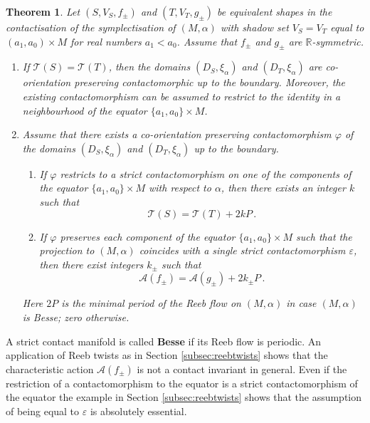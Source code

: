 \documentclass{amsart}
\newtheorem{thmintr}{Theorem}
\theoremstyle{definition}
\newcommand{\AAA}{\mathcal A}
\newcommand{\R}{\mathbb R}
\newcommand{\TT}{\mathcal T}
\begin{document}
\begin{thmintr}
\label{thmintr:contactbodiessympl}
Let $(S,V_S,f_{\pm})$ and $(T,V_T,g_{\pm})$
be equivalent shapes in the contactisation
of the symplectisation of $(M,\alpha)$
with shadow set $V_S=V_T$
equal to $(a_1,a_0)\times M$ for real numbers $a_1<a_0$.
Assume that $f_{\pm}$ and $g_{\pm}$ are $\R$-symmetric.
  	\begin{enumerate}
 	\item[(a)]
	If $\TT(S)=\TT(T)$,
	then the domains $(D_S,\xi_{\alpha})$
	and $(D_T,\xi_{\alpha})$
	are co-orientation preserving contactomorphic
	up to the boundary.
	Moreover,
	the existing contactomorphism can be assumed
	to restrict to the identity
	in a neighbourhood of the equator
	$\{a_1,a_0\}\times M$.
 	\item[(b)]
	Assume that there exists a co-orientation preserving
	contactomorphism $\varphi$ of the domains
	$(D_S,\xi_{\alpha})$ and $(D_T,\xi_{\alpha})$
	up to the boundary.
  		\begin{enumerate}
 		\item[(i)]
		If $\varphi$ restricts to a strict contactomorphism
		on one of the components of the equator
		$\{a_1,a_0\}\times M$ with respect to $\alpha$,
		then there exists an integer $k$
		such that
		\[
		\TT(S)=\TT(T)+2kP
		\,.
		\]
 		\item[(ii)]
		If $\varphi$ preserves each component
		of the equator $\{a_1,a_0\}\times M$ such that
		the projection to $(M,\alpha)$ coincides
		with a single strict contactomorphism $\varepsilon$,
		then there exist integers $k_{\pm}$ such that
		\[
		\AAA(f_{\pm})=\AAA(g_{\pm})+2k_{\pm}P
		\,.
		\]
  		\end{enumerate}
	Here $2P$ is the minimal period
	of the Reeb flow on $(M,\alpha)$
	in case $(M,\alpha)$ is Besse;
	zero otherwise.
  	\end{enumerate}
\end{thmintr}


A strict contact manifold is called {\bf Besse}
if its Reeb flow is periodic.
An application of Reeb twists
as in Section \ref{subsec:reebtwists}
shows that the characteristic action $\AAA(f_{\pm})$
is not a contact invariant in general.
Even if the restriction of a contactomorphism
to the equator is a strict contactomorphism of the equator
the example in Section \ref{subsec:reebtwists} shows
that the assumption of being equal to $\varepsilon$
is absolutely essential.


\end{document}
